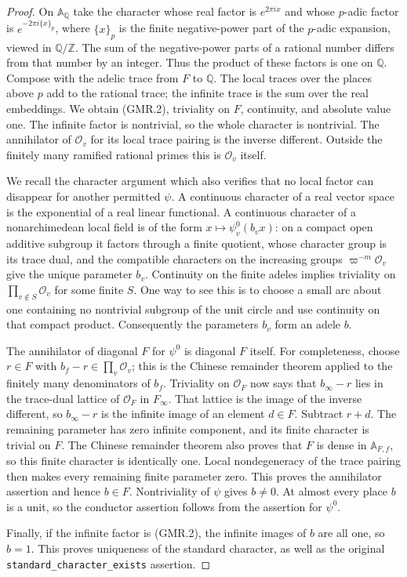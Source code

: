 \begin{proof}
On $\mathbb A_{\mathbb Q}$ take the character whose real factor is
$e^{2\pi ix}$ and whose $p$-adic factor is
$e^{-2\pi i\{x\}_p}$, where $\{x\}_p$ is the finite negative-power
part of the $p$-adic expansion, viewed in $\mathbb Q/\mathbb Z$.
The sum of the negative-power parts of a rational number differs from
that number by an integer.  Thus the product of these factors is one
on $\mathbb Q$.  Compose with the adelic trace from $F$ to $\mathbb Q$.
The local traces over the places above $p$ add to the rational trace;
the infinite trace is the sum over the real embeddings.  We obtain
(GMR.2), triviality on $F$, continuity, and absolute value one.
The infinite factor is nontrivial, so the whole character is nontrivial.
The annihilator of $\mathcal O_v$ for its local trace pairing is the
inverse different.  Outside the finitely many ramified rational primes
this is $\mathcal O_v$ itself.

We recall the character argument which also verifies that no local
factor can disappear for another permitted $\psi$.  A continuous
character of a real vector space is the exponential of a real linear
functional.  A continuous character of a nonarchimedean local field is
of the form $x\mapsto\psi^0_v(b_vx)$: on a compact open additive subgroup
it factors through a finite quotient, whose character group is its
trace dual, and the compatible characters on the increasing groups
$\varpi^{-m}\mathcal O_v$ give the unique parameter $b_v$.
Continuity on the finite adeles implies triviality on
$\prod_{v\notin S}\mathcal O_v$ for some finite $S$.  One way to see
this is to choose a small arc about one containing no nontrivial
subgroup of the unit circle and use continuity on that compact product.
Consequently the parameters $b_v$ form an adele $b$.

The annihilator of diagonal $F$ for $\psi^0$ is diagonal $F$ itself.
For completeness, choose $r\in F$ with $b_f-r\in\prod_v\mathcal O_v$;
this is the Chinese remainder theorem applied to the finitely many
denominators of $b_f$.  Triviality on $\mathcal O_F$ now says that
$b_\infty-r$ lies in the trace-dual lattice of $\mathcal O_F$ in
$F_\infty$.  That lattice is the image of the inverse different, so
$b_\infty-r$ is the infinite image of an element $d\in F$.
Subtract $r+d$.  The remaining parameter has zero infinite component,
and its finite character is trivial on $F$.  The Chinese remainder
theorem also proves that $F$ is dense in $\mathbb A_{F,f}$, so this finite
character is identically one.  Local nondegeneracy of the trace pairing
then makes every remaining finite parameter zero.  This proves the
annihilator assertion and hence $b\in F$.  Nontriviality of $\psi$ gives
$b\ne0$.  At almost every place $b$ is a unit, so the conductor assertion
follows from the assertion for $\psi^0$.

Finally, if the infinite factor is (GMR.2), the infinite images of $b$
are all one, so $b=1$.  This proves uniqueness of the standard
character, as well as the original \texttt{standard\_character\_exists}
assertion.
\end{proof}

